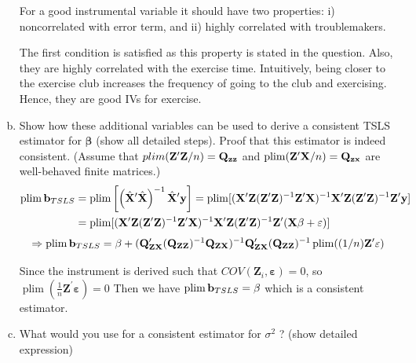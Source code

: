 \documentclass[11pt,reqno]{amsart}\usepackage[]{graphicx}\usepackage[]{color}
\newcommand{\mlt}[1]{\mathbf{#1}} %
\newcommand{\mgr}[1]{\mathbf{#1}}%
\newcommand{\ksp}{\vspace{0.1in}}   %
\newcommand{\kbeta}{\mgr{\beta}}
\newcommand{\kt}{^{\prime}}
\newcommand{\kX}{\mlt{X}}
\newcommand{\kZ}{\mlt{Z}}
\newcommand{\ky}{\mlt{y}}
\begin{document}
\begin{enumerate}[(a)]
For a good instrumental variable it should have two properties: i) noncorrelated with error term, and ii) highly correlated with troublemakers. 

The first condition is satisfied as this property is stated in the question. Also, they are highly correlated with the exercise time. Intuitively, being closer to the exercise club increases the frequency of going to the club and exercising. Hence, they are good IVs for exercise.\\

\ksp
\item Show how these additional variables can be used to derive a consistent TSLS estimator for $\kbeta$ (show all detailed steps). Proof that this estimator is indeed consistent. (Assume that $plim(\mlt{Z}\kt\mlt{Z}/n) = \bold{Q}_\bold{zz}$ and $\operatorname{plim}(\mlt{Z}\kt\kX/n) = \bold{Q}_\bold{zx}$ are well-behaved finite matrices.)\\


\begin{equation*}
\begin{split}
\operatorname{plim}\bold{b}_{TSLS} &= \operatorname{plim}\left[\left(\hat{\mlt{X}}^{\prime} \hat{\mlt{X}}\right)^{-1} \hat{\mlt{X}}^{\prime} \mlt{y}\right] = \operatorname{plim}[(\kX\kt\kZ(\kZ\kt\kZ)^{-1}\kZ\kt\kX)^{-1}\kX\kt\kZ(\kZ\kt\kZ)^{-1}\kZ\kt\ky]\\
&= \operatorname{plim} [(\kX\kt\kZ(\kZ\kt\kZ)^{-1}\kZ\kt\kX)^{-1}\kX\kt\kZ(\kZ\kt\kZ)^{-1}\kZ\kt(\kX\kbeta+\mgr{\varepsilon})]
\end{split}
\end{equation*}
\begin{equation*}
\begin{split}
\Rightarrow \operatorname{plim} \bold{b}_{TSLS}=\kbeta + (\bold{Q}\kt_{\mlt{Z}\kX}(\bold{Q}_{\mlt{Z}\mlt{Z}})^{-1}\bold{Q}_{\mlt{Z}\kX})^{-1}\bold{Q}\kt_{\mlt{Z}\kX}(\bold{Q}_{\mlt{Z}\mlt{Z}})^{-1} \operatorname{plim}((1/n)\mlt{Z}\kt\mgr{\varepsilon})
\end{split}
\end{equation*}

Since the instrument is derived such that $COV(\mlt{Z}_i , \mgr{\varepsilon})=0$, so $\operatorname{plim}(\frac{1}{n}\mlt{Z}\kt\mgr{\varepsilon})=0$ Then we have
$\operatorname{plim} \bold{b}_{TSLS}=\kbeta$
which is a consistent estimator.\\

\item What would you use for a consistent estimator for $\sigma^{2}$ ? (show detailed expression)
\ksp


\end{enumerate}
\end{document}
